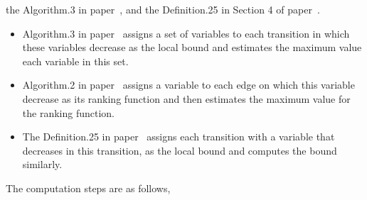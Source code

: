 the Algorithm.3 in paper~\cite{ZulegerGSV11},
and the Definition.25 in Section 4 of paper~\cite{sinn2017complexity}.
\begin{itemize}
\item Algorithm.3 in paper~\cite{ZulegerGSV11} assigns a set of variables to each transition in which these variables decrease as the local bound
and estimates the maximum value each variable in this set.
\item Algorithm.2 in paper~\cite{SinnZV14} assigns a variable to each edge on which this variable decrease as its ranking function
and then estimates the maximum value for the ranking function.
\item The Definition.25 in paper~\cite{sinn2017complexity}
assigns each transition with a variable that decreases in this transition, as the local bound and computes the bound similarly.
\end{itemize}
%
The computation steps are as follows,
